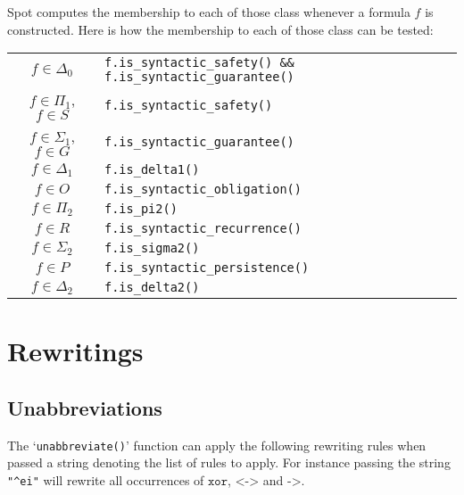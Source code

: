 \documentclass[a4paper,twoside,10pt,DIV=12]{scrreprt}
\newcommand{\XOR}{\mathbin{\texttt{xor}}}
\newcommand{\IMPLIES}{\mathbin{\texttt{->}}}
\newcommand{\EQUIV}{\mathbin{\texttt{<->}}}
\newcommand{\0}{\texttt{0}}
\newcommand{\1}{\texttt{1}}
\begin{document}
Spot computes the membership to each of those class whenever a formula
$f$ is constructed.  Here is how the membership to each of those class
can be tested:
\begin{center}
\begin{tabular}{cl}
  \toprule
  $f\in \Delta_0$ & \texttt{f.is\_syntactic\_safety() \&\& f.is\_syntactic\_guarantee()} \\
  $f\in \Pi_1$, $f\in S$ & \texttt{f.is\_syntactic\_safety()} \\
  $f\in \Sigma_1$, $f\in G$ & \texttt{f.is\_syntactic\_guarantee()} \\
  $f\in \Delta_1$ & \texttt{f.is\_delta1()} \\
  $f\in O$ & \texttt{f.is\_syntactic\_obligation()} \\
  $f\in \Pi_2$ & \texttt{f.is\_pi2()} \\
  $f\in R$ & \texttt{f.is\_syntactic\_recurrence()} \\
  $f\in \Sigma_2$ & \texttt{f.is\_sigma2()} \\
  $f\in P$ & \texttt{f.is\_syntactic\_persistence()} \\
  $f\in \Delta_2$ & \texttt{f.is\_delta2()} \\
  \bottomrule
\end{tabular}
\end{center}


\chapter{Rewritings}

\section{Unabbreviations}\label{sec:unabbrev}

The `\verb=unabbreviate()=' function can apply the following rewriting
rules when passed a string denoting the list of rules to apply.  For
instance passing the string \texttt{"\^{}ei"} will rewrite all
occurrences of $\XOR$, $\EQUIV$ and $\IMPLIES$.
\end{document}
